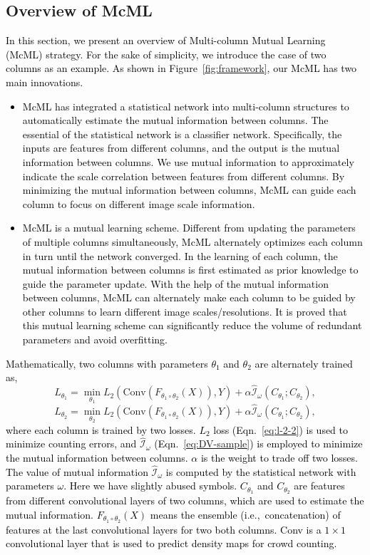 \documentclass[sigconf]{acmart}
\newcommand{\ljx}[1]{\textcolor{black}{#1}}
\newcommand{\czq}[1]{\textcolor{black}{#1}}
\newcommand{\beq}{\begin{equation}}
\newcommand{\eeq}{\end{equation}}
\newcommand{\II}{\mathcal{I}}
\newcommand\Eq{Eqn.}
\newcommand\Fig{Figure}
\begin{document}
\subsection{Overview of McML}
\label{sec:overview-of-McML}
\czq{In this section, we present an overview of Multi-column Mutual Learning (McML) strategy.
For the sake of simplicity, we introduce the case of two columns as an example.
As shown in \Fig~\ref{fig:framework}, our McML has two main innovations.
\begin{itemize}
\item McML has integrated a statistical network into multi-column structures to automatically estimate the mutual information between columns.
The essential of the statistical network is a classifier network.
Specifically, the input\ljx{s} are features from different columns, and the output is the mutual information between columns.
We use mutual information to approximately indicate the scale correlation between features from different columns.
By minimizing the mutual information between columns, McML can guide each column to focus on different image scale information.
\vspace{1mm}
\item McML is a mutual learning \ljx{scheme}.
Different from updating the parameters of multiple columns simultaneously, McML alternately optimizes each column in turn until the network converged.
In the learning of each column, the mutual information between columns is first estimated as prior knowledge to guide the parameter update.
With the help of the mutual information between columns, McML can alternately make each column to be guided by other columns to learn different image scales/resolutions.
It is proved that this mutual learning \ljx{scheme} can significantly reduce the volume of redundant parameters and avoid overfitting.
\end{itemize}}

\czq{Mathematically, two columns with parameters ${\theta_1}$ and ${\theta_2}$ are alternately trained as,}
\beq
\label{eq:column-1}
L_{\theta_1}=\min_{\theta_1} L_2(\mbox{Conv}(F_{\theta_1 \circ \theta_2}(X)),Y)+\alpha \widehat{\II}_{\omega}(C_{\theta_1}; C_{\theta_2}),
\eeq
\beq
\label{eq:column-2}
L_{\theta_2}=\min_{\theta_2} L_2(\mbox{Conv}(F_{\theta_1 \circ \theta_2}(X)),Y)+\alpha \widehat{\II}_{\omega}(C_{\theta_1}; C_{\theta_2}),
\eeq
\czq{where each column is trained by two losses.
$L_2$ loss (\Eq~\ref{eq:l-2-2}) is used to minimize counting errors, and $\widehat{\II}_{\omega}$ (\Eq~\ref{eq:DV-sample}) is employed to minimize the mutual information between columns.
$\alpha$ is the weight to trade off two losses.
The value of mutual information $\widehat{\II}_{\omega}$ is computed by the statistical network with parameters $\omega$.
Here we have slightly abused symbols.
$C_{\theta_1}$ and $C_{\theta_2}$ are features from different convolutional layers of two columns, which are used to estimate the mutual information.
$F_{\theta_1 \circ \theta_2}(X)$ means the ensemble (i.e.,~\czq{concatenation}) of features at the last convolutional layers for two both columns.
Conv is a $1 \times 1$ convolutional layer that is used to predict density maps for crowd counting.}
\end{document}
